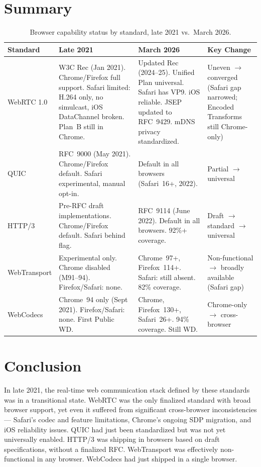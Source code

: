 \documentclass[11pt]{article}
\begin{document}
\section{Summary}

\begin{table}[ht]
\centering
\small
\renewcommand{\arraystretch}{1.3}
\begin{tabularx}{\textwidth}{lXXX}
\toprule
\textbf{Standard} & \textbf{Late 2021} & \textbf{March 2026} & \textbf{Key Change} \\
\midrule
WebRTC 1.0 &
  W3C Rec (Jan 2021). Chrome/Firefox full support. Safari limited: H.264 only, no simulcast, iOS DataChannel broken. Plan~B still in Chrome. &
  Updated Rec (2024--25). Unified Plan universal. Safari has VP9. iOS reliable. JSEP updated to RFC~9429. mDNS privacy standardized. &
  Uneven $\to$ converged (Safari gap narrowed; Encoded Transforms still Chrome-only) \\
\midrule
QUIC &
  RFC~9000 (May 2021). Chrome/Firefox default. Safari experimental, manual opt-in. &
  Default in all browsers (Safari~16+, 2022). &
  Partial $\to$ universal \\
\midrule
HTTP/3 &
  Pre-RFC draft implementations. Chrome/Firefox default. Safari behind flag. &
  RFC~9114 (June 2022). Default in all browsers. 92\%+ coverage. &
  Draft $\to$ standard $\to$ universal \\
\midrule
WebTransport &
  Experimental only. Chrome disabled (M91--94). Firefox/Safari: none. &
  Chrome~97+, Firefox~114+. Safari: still absent. 82\% coverage. &
  Non-functional $\to$ broadly available (Safari gap) \\
\midrule
WebCodecs &
  Chrome~94 only (Sept 2021). Firefox/Safari: none. First Public WD. &
  Chrome, Firefox~130+, Safari~26+. 94\% coverage. Still WD. &
  Chrome-only $\to$ cross-browser \\
\bottomrule
\end{tabularx}
\caption{Browser capability status by standard, late 2021 vs.\ March 2026.}
\label{tab:summary}
\end{table}

\section{Conclusion}

In late 2021, the real-time web communication stack defined by these standards
was in a transitional state. WebRTC was the only finalized standard with
broad browser support, yet even it suffered from significant cross-browser
inconsistencies --- Safari's codec and feature limitations, Chrome's ongoing
SDP migration, and iOS reliability issues. QUIC had just been standardized
but was not yet universally enabled. HTTP/3 was shipping in browsers based on
draft specifications, without a finalized RFC. WebTransport was effectively
non-functional in any browser. WebCodecs had just shipped in a single
browser.
\end{document}
